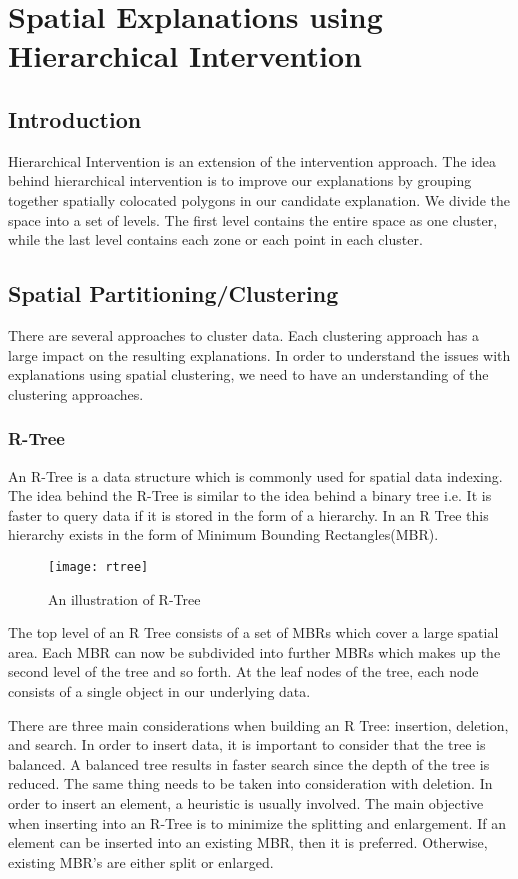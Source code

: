 \chapter{Spatial Explanations using Hierarchical Intervention}
\label{chp:proposed}
\label{sec:hei_intervention}

\section{Introduction}
Hierarchical Intervention is an extension of the intervention approach. The idea behind hierarchical intervention is to improve our explanations by grouping together spatially colocated polygons in our candidate explanation. We divide the space into a set of levels. The first level contains the entire space as one cluster, while the last level contains each zone or each point in each cluster.

\section{Spatial Partitioning/Clustering}
There are several approaches to cluster data. Each clustering approach has a large impact on the resulting explanations. In order to understand the issues with explanations using spatial clustering, we need to have an understanding of the clustering approaches.

\subsection{R-Tree}
An R-Tree is a data structure which is commonly used for spatial data indexing. The idea behind the R-Tree is similar to the idea behind a binary tree i.e. It is faster to query data if it is stored in the form of a hierarchy\citep{guttman1984r}. In an R Tree this hierarchy exists in the form of Minimum Bounding Rectangles(MBR).

\begin{figure}[ht]
\texttt{[image: rtree]}
\caption{An illustration of R-Tree}
\label{fig:rtree}
\end{figure}

The top level of an R Tree consists of a set of MBRs which cover a large spatial area. Each MBR can now be subdivided into further MBRs which makes up the second level of the tree and so forth. At the leaf nodes of the tree, each node consists of a single object in our underlying data.

There are three main considerations when building an R Tree: insertion, deletion, and search. In order to insert data, it is important to consider that the tree is balanced. A balanced tree results in faster search since the depth of the tree is reduced. The same thing needs to be taken into consideration with deletion.
In order to insert an element, a heuristic is usually involved. The main objective when inserting into an R-Tree is to minimize the splitting and enlargement. If an element can be inserted into an existing MBR, then it is preferred. Otherwise, existing MBR's are either split or enlarged.

